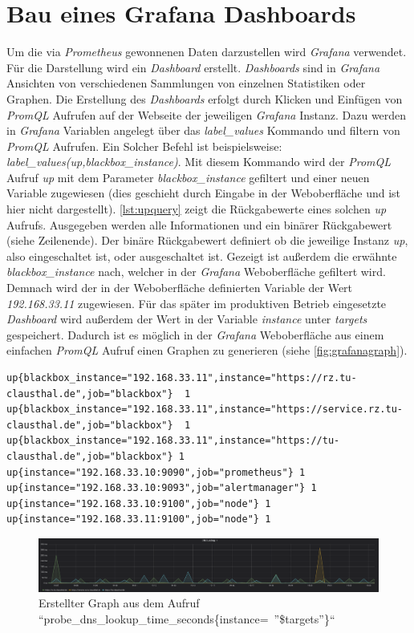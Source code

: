 \documentclass[titlepage]{report}
\begin{document}
\section{Bau eines Grafana Dashboards}
Um die via \emph{Prometheus} gewonnenen Daten darzustellen wird
\emph{Grafana} verwendet. Für die Darstellung wird ein \emph{Dashboard}
erstellt. \emph{Dashboards} sind in \emph{Grafana} Ansichten von
verschiedenen Sammlungen von einzelnen Statistiken oder Graphen. Die
Erstellung des \emph{Dashboards} erfolgt durch Klicken und Einfügen von
\emph{PromQL} Aufrufen auf der Webseite der jeweiligen \emph{Grafana} Instanz.
Dazu werden in \emph{Grafana} Variablen angelegt über das
\emph{label\_values} Kommando und filtern von \emph{PromQL} Aufrufen. Ein
Solcher Befehl ist beispielsweise:
\emph{label\_values(up,blackbox\_instance)}. Mit diesem Kommando wird der
\emph{PromQL} Aufruf \emph{up} mit dem Parameter
\emph{blackbox\_instance} gefiltert und einer neuen Variable zugewiesen
(dies geschieht durch Eingabe in der Weboberfläche und ist hier nicht
dargestellt). \autoref{lst:upquery} zeigt die Rückgabewerte eines
solchen \emph{up} Aufrufs. Ausgegeben werden alle Informationen und ein
binärer Rückgabewert (siehe Zeilenende). Der binäre Rückgabewert
definiert ob die jeweilige Instanz \emph{up}, also eingeschaltet ist,
oder ausgeschaltet ist. Gezeigt ist außerdem die erwähnte
\emph{blackbox\_instance} nach, welcher in der \emph{Grafana}
Weboberfläche gefiltert wird. Demnach wird der in der Weboberfläche
definierten Variable der Wert \emph{192.168.33.11} zugewiesen. Für das
später im produktiven Betrieb eingesetzte \emph{Dashboard} wird außerdem
der Wert in der Variable \emph{instance} unter \emph{targets}
gespeichert. Dadurch ist es möglich in der \emph{Grafana} Weboberfläche
aus einem einfachen \emph{PromQL} Aufruf einen Graphen zu generieren
(siehe \autoref{fig:grafanagraph}).
\begin{minipage}{\linewidth}
\begin{lstlisting}[caption={Rückgabewerte des up-Aufrufs in
PromQL},label={lst:upquery}]
up{blackbox_instance="192.168.33.11",instance="https://rz.tu-clausthal.de",job="blackbox"}	1
up{blackbox_instance="192.168.33.11",instance="https://service.rz.tu-clausthal.de",job="blackbox"}	1
up{blackbox_instance="192.168.33.11",instance="https://tu-clausthal.de",job="blackbox"}	1
up{instance="192.168.33.10:9090",job="prometheus"} 1
up{instance="192.168.33.10:9093",job="alertmanager"} 1
up{instance="192.168.33.10:9100",job="node"} 1
up{instance="192.168.33.11:9100",job="node"} 1
\end{lstlisting}
\end{minipage}
\begin{figure}[H]
    \centering
    \includegraphics[width=1.0\textwidth]{figures/grafana_graph.png}
    \caption{Erstellter Graph aus dem Aufruf ``probe\_dns\_lookup\_time\_seconds\{instance=~''\$targets''\}``}\label{fig:grafanagraph}
\end{figure}
\end{document}
